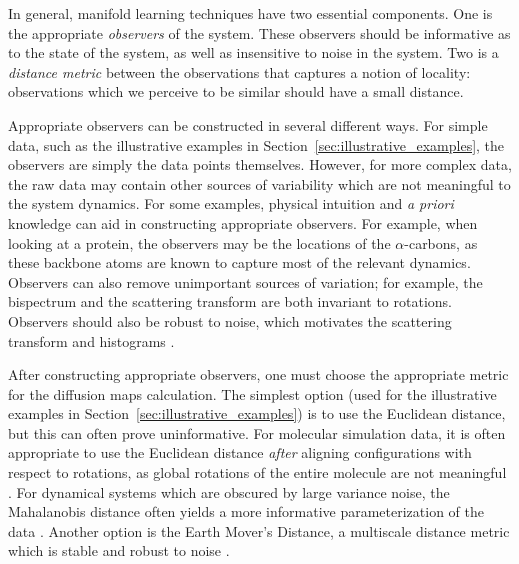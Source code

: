 \documentclass[preprint]{elsarticle}
\begin{document}
In general, manifold learning techniques have two essential components.
%
One is the appropriate {\em observers} of the system. 
%
These observers should be informative as to the state of the system, as well as insensitive to noise in the system. 
%
Two is a {\em distance metric} between the observations that captures a notion of locality: observations which we perceive to be similar should have a small distance. 
%


Appropriate observers can be constructed in several different ways. 
%
For simple data, such as the illustrative examples in Section~\ref{sec:illustrative_examples}, the observers are simply the data points themselves. 
%
However, for more complex data, the raw data may contain other sources of variability which are not meaningful to the system dynamics. 
%
For some examples, physical intuition and {\em a priori} knowledge can aid in constructing appropriate observers. 
%
For example, when looking at a protein, the observers may be the locations of the $\alpha$-carbons, as these backbone atoms are known to capture most of the relevant dynamics. 
%
Observers can also remove unimportant sources of variation; 
for example, the bispectrum \cite{zhao2014rotationally} and the scattering transform \cite{mallat2012group} are both invariant to rotations. 
%
Observers should also be robust to noise, which motivates the scattering transform \cite{mallat2012group} and histograms \cite{talmon2013empirical}.

After constructing appropriate observers, one must choose the appropriate metric for the diffusion maps calculation. 
%
The simplest option (used for the illustrative examples in Section~\ref{sec:illustrative_examples}) is to use the Euclidean distance, but this can often prove uninformative. 
%
For molecular simulation data, it is often appropriate to use the Euclidean distance {\em after} aligning configurations with respect to rotations, as global rotations of the entire molecule are not meaningful \cite{ferguson2010systematic}.
%
For dynamical systems which are obscured by large variance noise, the Mahalanobis distance often yields a more informative parameterization of the data \cite{talmon2013empirical}.
%
Another option is the Earth Mover's Distance, a multiscale distance metric which is stable and robust to noise \cite{rubner2000earth}.
\end{document}
